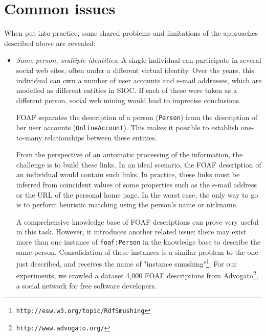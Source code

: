 \documentclass{../templates/www2008-submission}
\begin{document}
\section{Common issues}\label{sec:problems}

When put into practice, some shared problems and limitations
of the approaches described above are revealed:

\begin{itemize}
  \item \emph{Same person, multiple identities}. A single individual can
        participate in several social web sites, often under a different
        virtual identity. Over the years, this individual can own a
        number of user accounts and e-mail addresses, which are modelled
        as different entities in SIOC. If each of these were taken as
        a different person, social web mining would lead to imprecise
        conclusions.

        FOAF separates the description of a person
        (\texttt{Person})
        from the description of her user accounts (\texttt{OnlineAccount}).
        This makes it possible to establish one-to-many relationships
        between these entities.


        From the perspective of an automatic processing of the
        information, the challenge is to build these links. In an
        ideal scenario, the FOAF description of an individual would
        contain such links. In practice, these links must be
        inferred from coincident values of some properties such
        as the e-mail address or the URL of the personal home page.
        In the worst case, the only way to go is to perform heuristic matching
        using the person's name or nickname.

        A comprehensive knowledge base of FOAF descriptions can prove
        very useful in this task. However, it introduces another related issue:
        there may exist more than
        one instance of \texttt{foaf:Person} in the knowledge base
        to describe the same person.
        Consolidation of these instances is a similar problem to the
        one just described, and receives the name of "instance
        smushing"\footnote{\texttt{http://esw.w3.org/topic/RdfSmushing}}.
        For our experiments, we crawled a dataset 4,000 FOAF descriptions
        from Advogato\footnote{\texttt{http://www.advogato.org/}}, a social
        network for free software developers.


\end{itemize}
\end{document}
